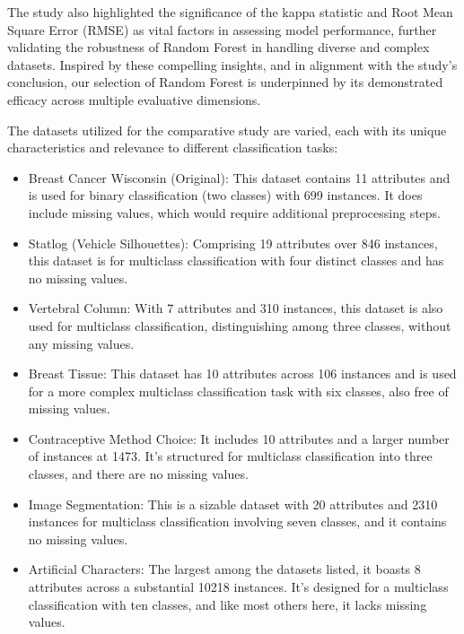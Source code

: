 The study \cite{siraj2023performanceModelComparison} also highlighted the significance of the kappa statistic and Root Mean Square Error (RMSE) as vital factors in assessing model performance, further validating the robustness of Random Forest in handling diverse and complex datasets. Inspired by these compelling insights, and in alignment with the study’s conclusion, our selection of Random Forest is underpinned by its demonstrated efficacy across multiple evaluative dimensions.

The datasets utilized for the comparative study are varied, each with its unique characteristics and relevance to different classification tasks:
\begin{itemize}
 
\item Breast Cancer Wisconsin (Original): This dataset contains 11 attributes and is used for binary classification (two classes) with 699 instances. It does include missing values, which would require additional preprocessing steps.

\item Statlog (Vehicle Silhouettes): Comprising 19 attributes over 846 instances, this dataset is for multiclass classification with four distinct classes and has no missing values.

\item Vertebral Column: With 7 attributes and 310 instances, this dataset is also used for multiclass classification, distinguishing among three classes, without any missing values.

\item Breast Tissue: This dataset has 10 attributes across 106 instances and is used for a more complex multiclass classification task with six classes, also free of missing values.

\item Contraceptive Method Choice: It includes 10 attributes and a larger number of instances at 1473. It’s structured for multiclass classification into three classes, and there are no missing values.

\item Image Segmentation: This is a sizable dataset with 20 attributes and 2310 instances for multiclass classification involving seven classes, and it contains no missing values.

\item Artificial Characters: The largest among the datasets listed, it boasts 8 attributes across a substantial 10218 instances. It’s designed for a multiclass classification with ten classes, and like most others here, it lacks missing values.

\end{itemize}

